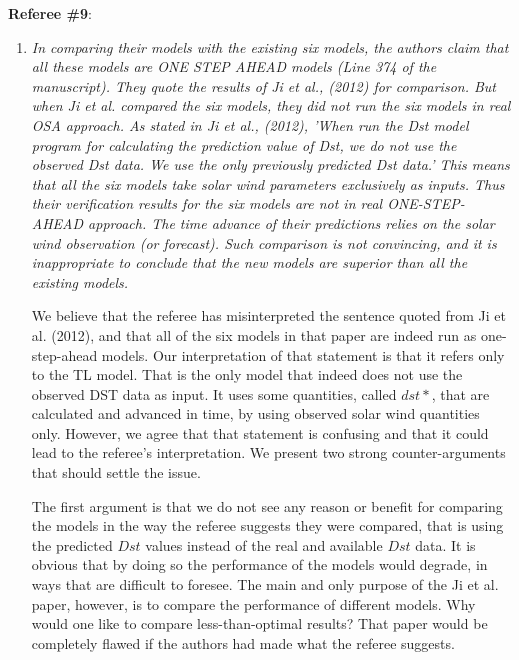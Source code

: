 \documentclass{article}
\begin{document}
\textbf{Referee \#9}: 

\begin{enumerate}
\item \emph{In comparing their models with the existing six models, the authors claim that all these models are ONE STEP AHEAD models (Line 374 of the manuscript). They quote the results of Ji et al., (2012) for comparison. But when Ji et al. compared the six models, they did not run the six models in real OSA approach. As stated in Ji et al., (2012),  'When run the Dst model program for calculating the prediction value of Dst, we do not use the observed Dst data. We use the only previously predicted Dst data.' This means that all the six models take solar wind parameters exclusively as inputs. Thus their verification results for the six models are not in real ONE-STEP-AHEAD approach. The time advance of their predictions relies on the solar wind observation (or forecast). Such comparison is not convincing, and it is inappropriate to conclude that the new models are superior than all the existing models.}

We believe that the referee has misinterpreted the sentence quoted from Ji et al. (2012), and that all of the six models in that paper are indeed run as one-step-ahead models. Our interpretation of that statement is that it refers only to the TL model. That is the only model that indeed does not use the observed DST data as input. It uses some quantities, called $dst*$, that are calculated and advanced in time, by using observed solar wind quantities only. 
However, we agree that that statement is confusing and that it could lead to the referee's interpretation. We present two strong counter-arguments that should settle the issue.

The first argument is that we do not see any reason or benefit for comparing the models in the way the referee suggests they were compared, that is using the predicted $Dst$ values instead of the real and available $Dst$ data. It is obvious that by doing so the performance of the models would degrade, in ways that are difficult to foresee. The main and only purpose of the Ji et al. paper, however, is to compare the performance of different models. Why would one like to compare less-than-optimal results? That paper would be completely flawed if the authors had made what the referee suggests. 


\end{enumerate}
\end{document}
